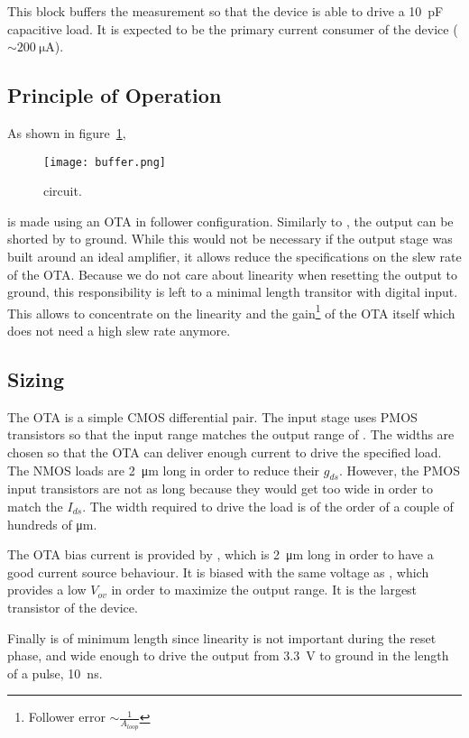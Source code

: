 This block buffers the measurement so that the device is able to drive a \SI{10}{\pico\farad} capacitive load. It is expected to be the primary current consumer of the device ($\sim \SI{200}{\micro\ampere}$).

\subsection{Principle of Operation}
As shown in figure~\ref{fig:buffer},
\begin{figure}
  \centering
  \texttt{[image: buffer.png]}
  \caption{ circuit.\label{fig:buffer}}
\end{figure}
 is made using an OTA in follower configuration.
Similarly to , the output can be shorted by  to ground.
While this would not be necessary if the output stage was built around an ideal amplifier, it allows reduce the specifications on the slew rate of the OTA.
Because we do not care about linearity when resetting the output to ground, this responsibility is left to a minimal length transitor with digital input.
This allows to concentrate on the linearity and the gain\footnote{Follower error $\sim \frac{1}{A_{loop}}$} of the OTA itself which does not need a high slew rate anymore.

\subsection{Sizing}
The OTA is a simple CMOS differential pair. The input stage uses PMOS transistors so that the input range matches the output range of .
The widths are chosen so that the OTA can deliver enough current to drive the specified load. The NMOS loads are \SI{2}{\micro\meter} long in order to reduce their $g_{ds}$. However, the PMOS input transistors are not as long because they would get too wide in order to match the $I_{ds}$. The width required to drive the load is of the order of a couple of hundreds of \si{\micro\meter}.

The OTA bias current is provided by , which is \SI{2}{\micro\meter} long in order to have a good current source behaviour. It is biased with the same voltage as , which provides a low $V_{ov}$ in order to maximize the output range. It is the largest transistor of the device.

Finally  is of minimum length since linearity is not important during the reset phase, and wide enough to drive the output from \SI{3.3}{\volt} to ground in the length of a pulse, \SI{10}{\nano\second}.
